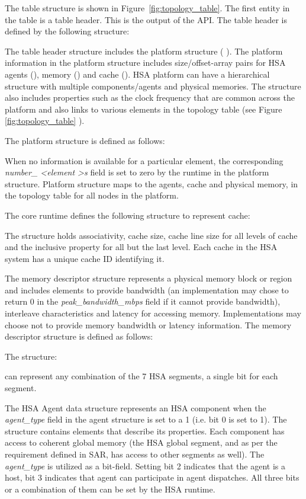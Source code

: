 The table structure is shown in Figure~\ref{fig:topology_table}.
The first entity in the table is a table header. This is the output
of the  API.
The table header is defined by the following structure:


The table header structure includes the platform structure (
).  The platform information in the platform
structure includes size/offset-array pairs for HSA agents
(), memory () and
cache ().  
HSA platform can have a hierarchical structure with multiple
components/agents and physical memories.  The
 structure also includes properties such as
the clock frequency that are common across the platform and also
links to various elements in the topology table (see Figure
\ref{fig:topology_table} ).

The platform structure is defined as follows:



When no information is available for a particular element, the
corresponding {\itshape number\_ \textless element \textgreater s}
field is set to zero by the runtime in the platform structure.
Platform structure maps to the agents, cache and physical memory,
in the topology table for all nodes in the platform. 

The core runtime defines the following structure to represent cache:

The structure holds associativity, cache size, cache line size for
all levels of cache and the inclusive property for all but the
last level. Each cache in the HSA system has a unique cache ID
identifying it.

The memory descriptor structure represents a physical memory block
or region and includes elements to provide bandwidth (an
implementation may chose to return 0 in the {\itshape
peak\_bandwidth\_mbps} field if it cannot provide bandwidth), interleave
characteristics and latency for accessing memory. Implementations
may choose not to provide memory bandwidth or latency information.
The memory descriptor structure is defined as follows:

 

The structure: 
 
can represent any combination of the 7 HSA segments, a single
bit for each segment. 

The HSA Agent data structure represents an HSA component when the
{\itshape agent\_type} field in the agent structure is set to a 1
(i.e. bit 0 is set to 1).
The structure contains elements that describe its properties. Each
component has access to coherent global memory (the HSA global
segment, and as per the requirement defined in SAR, has access to
other segments as well). The {\itshape agent\_type} is utilized as a
bit-field. Setting bit 2 indicates that the agent is a host, bit 3
indicates that agent can participate in agent dispatches. All
three bits or a combination of them can be set by the HSA runtime.

